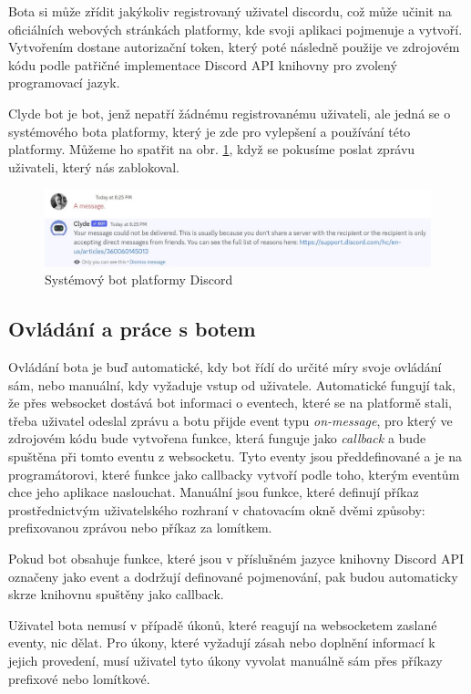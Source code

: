\documentclass[
  program=inf,
biblatex=false,
sourcecodes=true,
joinlists=true,
  figures=true,
  tables=true,
  glossaries=true,
  index=false
]{kidiplom}
\begin{document}
Bota si může zřídit jakýkoliv registrovaný uživatel discordu, což může učinit na 
oficiálních webových stránkách platformy, kde svoji aplikaci pojmenuje a vytvoří. 
Vytvořením dostane autorizační token, který poté následně použije ve zdrojovém kódu
podle patřičné implementace Discord API knihovny pro zvolený programovací jazyk.

Clyde bot je bot, jenž nepatří žádnému registrovanému uživateli, ale jedná se o systémového bota
platformy, který je zde pro vylepšení a používání této platformy. Můžeme ho spatřit
na obr. \ref{clyde}, když se pokusíme poslat zprávu uživateli, který nás zablokoval.

\begin{figure}
  \centering \includegraphics[scale=0.58]{clyde}
  \caption{\label{clyde}Systémový bot platformy Discord}
\end{figure}


\subsection{Ovládání a práce s botem}
Ovládání bota je buď automatické, kdy bot řídí do určité míry svoje ovládání sám, nebo manuální, kdy vyžaduje
vstup od uživatele. Automatické fungují tak, že přes
websocket dostává bot informaci o eventech, které se na platformě stali, třeba uživatel
odeslal zprávu a botu přijde event typu {\it on-message}, pro který ve zdrojovém kódu 
bude vytvořena funkce, která funguje jako {\it callback} a bude spuštěna při tomto
eventu z websocketu. Tyto eventy jsou předdefinované a je na programátorovi, které funkce jako
callbacky vytvoří podle toho, kterým eventům chce jeho aplikace naslouchat. Manuální jsou funkce, které 
definují příkaz prostřednictvým uživatelského rozhraní v chatovacím okně dvěmi způsoby:
prefixovanou zprávou nebo příkaz za lomítkem.

Pokud bot obsahuje funkce, které jsou v příslušném jazyce knihovny Discord API označeny jako event 
a dodržují definované pojmenování, pak budou automaticky skrze knihovnu spuštěny jako callback.

Uživatel bota nemusí v případě úkonů, které reagují na websocketem zaslané eventy, nic dělat. 
Pro úkony, které vyžadují zásah nebo doplnění informací k jejich provedení, musí uživatel tyto úkony
vyvolat manuálně sám přes příkazy prefixové nebo lomítkové.
\end{document}
